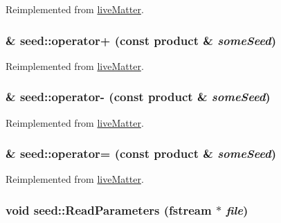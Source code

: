 Reimplemented from \hyperlink{classlive_matter_ab14efacc07e048507a6c3dd8d2942101}{liveMatter}.\hypertarget{classseed_acb2c018454084660561fa623ca2ee6da}{
\subsubsection[{operator+}]{ \& seed::operator+ (const {\bf product} \& {\em someSeed})}}
\label{classseed_acb2c018454084660561fa623ca2ee6da}


Reimplemented from \hyperlink{classlive_matter_ae7a333e94f166a448a4b8f8b70ebe9fe}{liveMatter}.\hypertarget{classseed_a950984dedb76a7de041bc2ca20a0ecdd}{
\subsubsection[{operator-\/}]{ \& seed::operator-\/ (const {\bf product} \& {\em someSeed})}}
\label{classseed_a950984dedb76a7de041bc2ca20a0ecdd}


Reimplemented from \hyperlink{classlive_matter_a6b8311a516ba78a7caacc80a28ec143e}{liveMatter}.\hypertarget{classseed_af52e1504b4da971919e451f53fa0802f}{
\subsubsection[{operator=}]{ \& seed::operator= (const {\bf product} \& {\em someSeed})}}
\label{classseed_af52e1504b4da971919e451f53fa0802f}


Reimplemented from \hyperlink{classlive_matter_a3b1eb79d0f248a4459874db44c335cac}{liveMatter}.\hypertarget{classseed_a8212329dfb9f4a2bc4c8a0fe401efaf3}{
\subsubsection[{ReadParameters}]{\setlength{\rightskip}{0pt plus 5cm}void seed::ReadParameters (fstream $\ast$ {\em file})}}
\label{classseed_a8212329dfb9f4a2bc4c8a0fe401efaf3}


